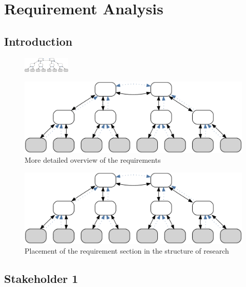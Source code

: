 \cleardoublepage
\chapter{Requirement Analysis}\label{sec:reqs}\minitoc\vspace{.5cm}

\section{Introduction}

\begin{figure}
    \centering
    \includegraphics[width=0.2\textwidth]{resources/images/example3}
\end{figure}


\begin{figure}[H]
    \centering
    \includegraphics[width=.85\textwidth]{resources/images/example3}
    \caption{More detailed overview of the requirements}\label{fig:req:details}
\end{figure}


\begin{figure}[H]
    \centering
    \includegraphics[width=.55\textwidth]{resources/images/example3}
    \caption{Placement of the requirement section in the structure of research}\label{fig:hourglass:reqs}
\end{figure}

\section{Stakeholder 1}

